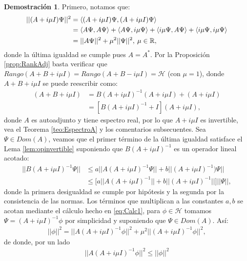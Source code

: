 \documentclass[12pt]{article}
\theoremstyle{definition}
\newtheorem*{demo}{Demostración}
\newcommand*{\field}[1]{\mathbb{#1}}
\begin{document}
\begin{demo}
    Primero, notamos que:
    \begin{align}
        ||(A+i\mu I)\Psi||^2 & =
        \langle (A+i\mu I)\Psi, (A+i\mu I)\Psi\rangle
        \notag
        \\ &=
        \langle A\Psi, A\Psi\rangle +
        \langle A\Psi,i\mu\Psi\rangle +
        \langle i\mu \Psi, A\Psi \rangle + 
        \langle i\mu\Psi, i\mu \Psi\rangle
        \notag
        \\ & =
        ||A\Psi||^2 + \mu^2||\Psi||^2, \:\mu \in\field{R},
        \label{eq:Calc1}
    \end{align}
    donde la última igualdad se cumple pues $A=A^*$.
    Por la Proposición \ref{prop:RankAdj} basta verificar que $Rango(A+B+i\mu I) = Rango(A+B-i\mu I)=\mathcal{H}$ (con $\mu = 1$), donde $A+B+i\mu I$ se puede reescribir como:
    \begin{align*}
        (A+B+i\mu I) & = B(A+i\mu I)^{-1}(A+i\mu I) + (A+i\mu I) 
        \\
        & =
        [B(A+i\mu I)^{-1} + I](A+i\mu I),
    \end{align*}
    donde $A$ es autoadjunto y tiene espectro real, por lo que $A+i\mu I$ es invertible, vea el Teorema \ref{teo:EspectroA} y los comentarios subsecuentes.
    Sea $\Psi \in Dom(A)$, veamos que el primer término de la última igualdad satisface el Lema \ref{lem:opinvertible} suponiendo que $B(A+i\mu I)^{-1}$ es un operador lineal acotado:
    \begin{align}
        ||B(A+i\mu I)^{-1}\Psi|| & \leq
        a||A(A+i\mu I)^{-1}\Psi|| + b||(A+i\mu I)^{-1})\Psi||
        \nonumber
        \\
        & \leq
        \bigg[a||A(A+i\mu I)^{-1}|| +
        b||(A+i\mu I)^{-1}||
        \bigg]||\Psi||,
        \label{eq:Apoyo3KR}
    \end{align}
    donde la primera desigualdad se cumple por hipótesis y la segunda por la consistencia de las normas. Los términos que multiplican a las constantes $a, b$ se acotan mediante el cálculo hecho en \eqref{eq:Calc1}, para $\phi\in\mathcal{H}$  tomamos $\Psi = (A+i\mu I)^{-1}\phi$ por simplicidad y suponiendo que $\Psi\in Dom(A)$. Así:
    \begin{align*}
        ||\phi||^2 = ||A(A+i\mu I)^{-1}\phi||^2 + \mu^2||(A+i\mu I)^{-1}\phi||^2,
    \end{align*}
    de donde, por un lado
    \begin{align}
        ||A(A+i\mu I)^{-1}\phi||^2 \leq ||\phi||^2

\end{align}
\end{demo}
\end{document}
